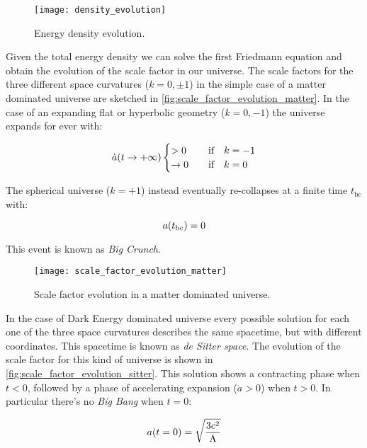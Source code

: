 \begin{figure}
        \centering
        \texttt{[image: density\_evolution]}
        \caption{Energy density evolution.}
        \label{fig:density_evolution}
\end{figure}

Given the total energy density we can solve the first Friedmann equation
and obtain the evolution of the scale factor in our universe. The scale
factors for the three different space curvatures ($k = 0,\pm 1$) in the
simple case of a matter dominated universe are sketched in
\autoref{fig:scale_factor_evolution_matter}. In the case of an expanding
flat or hyperbolic geometry ($k = 0,-1$) the universe expands for ever with:

\begin{equation}
        \dot a\qty(t \rightarrow +\infty)
                \begin{cases}
                        > 0 & \qif k = -1 \\
                        \rightarrow 0 & \qif k = 0
                \end{cases}
\end{equation}

The spherical universe ($k = +1$) instead eventually re-collapses at a finite
time $t_{\text{bc}}$ with:

\begin{equation}
        a\qty(t_{\text{bc}}) = 0
\end{equation}

This event is known as \emph{Big Crunch}.

\begin{figure}
        \centering
        \texttt{[image: scale\_factor\_evolution\_matter]}
        \caption{Scale factor evolution in a matter dominated universe.}
        \label{fig:scale_factor_evolution_matter}
\end{figure}

In the case of Dark Energy dominated universe every possible solution for
each one of the three space curvatures describes the same spacetime, but with
different coordinates. This spacetime is known as \emph{de Sitter space}.
The evolution of the scale factor for this kind of universe is shown in
\autoref{fig:scale_factor_evolution_sitter}. This solution shows a
contracting phase when $t < 0$, followed by a phase of accelerating
expansion ($\ddot a > 0$) when $t > 0$. In particular there's no
\emph{Big Bang} when $t = 0$:

\begin{equation}
        a\qty(t = 0) = \sqrt{\frac{3c^2}{\Lambda}}
\end{equation}

